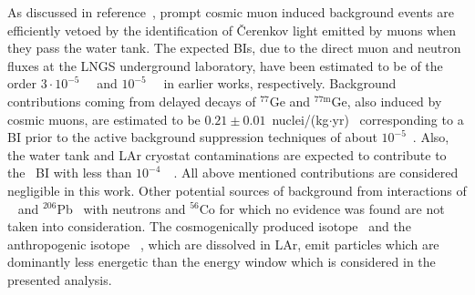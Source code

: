 As discussed in reference~\cite{Agostini2013a}, prompt cosmic muon induced background
events are efficiently vetoed by the identification of \v{C}erenkov light emitted by muons
when they pass the water tank. The expected BIs, due to the direct muon and neutron fluxes
at the LNGS underground laboratory, have been estimated to be of the order
$3\cdot10^{-5}$~\ctsper~\cite{Freund2014} and $10^{-5}$~\ctsper~\cite{Meierhofer2012} in
earlier works, respectively.  Background contributions coming from delayed decays of
$^{77}$Ge and $^{77\text{m}}$Ge, also induced by cosmic muons, are estimated to be
$0.21\pm0.01$~nuclei/(kg$\cdot$yr)~\cite{Wiesinger2018} corresponding to a BI prior to the
active background suppression techniques of about $10^{-5}$~\ctsper. Also, the water tank
and LAr cryostat contaminations are expected to contribute to the \gerda\ BI with less
than $10^{-4}$~\ctsper~\cite{Ackermann2012, Barabanov2009}. All above mentioned
contributions are considered negligible in this work. Other potential sources of
background from interactions of \gesix~\cite{Meierhofer2012, Vanhoefen2018} and
$^{206}$Pb~\cite{Mei2007} with neutrons and $^{56}$Co for which no evidence was found are
not taken into consideration. The cosmogenically produced isotope \Arl\ and the
anthropogenic isotope \Kr~\cite{Winger2005}, which are dissolved in LAr, emit particles
which are dominantly less energetic than the energy window which is considered in the
presented analysis.

